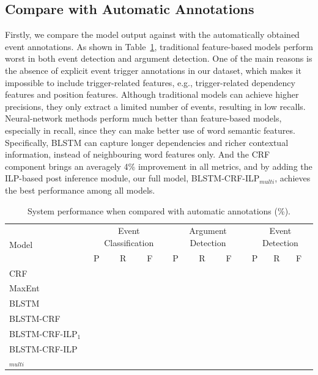 \subsection{Compare with Automatic Annotations}
Firstly, we compare the model output against with the automatically obtained event annotations. 
As shown in Table~\ref{tab:1}, traditional feature-based models perform worst in both event detection and argument detection. 
One of the main reasons is the absence of explicit event trigger annotations in our dataset, which makes it impossible to include trigger-related features, e.g., trigger-related dependency features and position features. 
Although traditional models can achieve higher precisions, they only extract a limited number of events, resulting in low recalls. 
Neural-network methods perform much better than feature-based models, especially in recall, since they can make better use of word semantic features. Specifically, BLSTM can capture longer dependencies and richer contextual information, instead of neighbouring word features only.
And the CRF component brings an averagely 4\% improvement in all metrics, and by adding the ILP-based post inference module, our full model, BLSTM-CRF-ILP$_{multi}$, achieves the best performance among all models. 

\begin{table}[!t]
\centering
\small
\begin{tabular}{|l|p{0.8cm}<{\centering}|p{0.8cm}<{\centering}|p{0.8cm}<{\centering}|p{0.8cm}<{\centering}|p{0.8cm}<{\centering}|p{0.8cm}<{\centering}|p{0.8cm}<{\centering}|p{0.8cm}<{\centering}|p{0.8cm}<{\centering}|} \hline
	\multirow{2}{*}{Model} & \multicolumn{3}{c|}{Event Classification} & \multicolumn{3}{c|}{Argument Detection} &
	\multicolumn{3}{c|}{Event Detection} \\ \cline{2-10}
	 & P & R & F & P & R & F & P & R & F \\ \hline
	CRF &  &  &  &  &  &  &  &  &  \\ \hline
	MaxEnt &  &  &  &  &  &  &  &  &  \\ \hline
	BLSTM &  &  &  &  &  &  &  &  &   \\ \hline \hline
	BLSTM-CRF &  &  &  &  &  &  &  &  &   \\ \hline
	BLSTM-CRF-ILP$_{1}$ &  &  &  &  &  &  &  &  &  \\ \hline
	BLSTM-CRF-ILP$_{multi}$ &  &  &  &  &  &  &  &  &  \\ \hline
\end{tabular}
\caption{System performance when compared with automatic annotations (\%).  \label{tab:1}}
\end{table}

